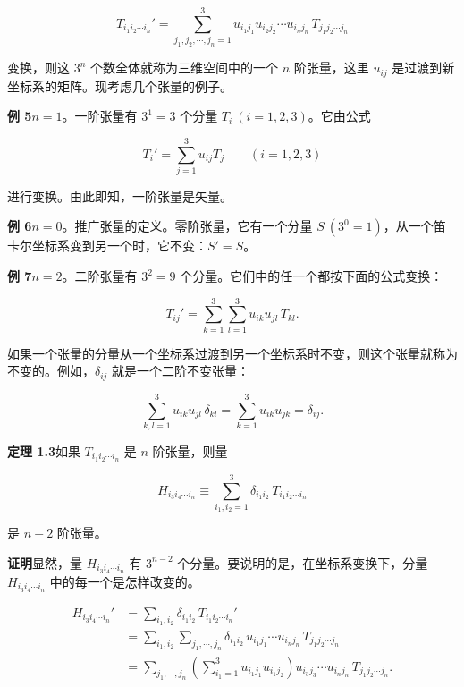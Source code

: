 \documentclass[11pt,a4paper,oneside]{ctexbook}
\begin{document}
\begin{equation}
T_{i_1 i_2 \cdots i_n}' = \sum_{j_1, j_2, \cdots, j_n = 1}^{3} u_{i_1 j_1} u_{i_2 j_2} \cdots u_{i_n j_n}\, T_{j_1 j_2 \cdots j_n}
\tag{1.21}
\end{equation}

变换，则这 $3^{n}$ 个数全体就称为三维空间中的一个 $n$ 阶张量，这里 $u_{ij}$ 是过渡到新坐标系的矩阵。现考虑几个张量的例子。

\textbf{例 5}\quad $n = 1$。一阶张量有 $3^{1} = 3$ 个分量 $T_i\ (i = 1, 2, 3)$。它由公式

\begin{equation*}
T_i' = \sum_{j=1}^{3} u_{ij} T_j \qquad (i = 1, 2, 3)
\end{equation*}

进行变换。由此即知，一阶张量是矢量。

\textbf{例 6}\quad $n = 0$。推广张量的定义。零阶张量，它有一个分量 $S\ (3^{0} = 1)$，从一个笛卡尔坐标系变到另一个时，它不变：$S' = S$。

\textbf{例 7}\quad $n = 2$。二阶张量有 $3^{2} = 9$ 个分量。它们中的任一个都按下面的公式变换：

\begin{equation*}
T_{ij}' = \sum_{k=1}^{3} \sum_{l=1}^{3} u_{ik} u_{jl}\, T_{kl}.
\end{equation*}

如果一个张量的分量从一个坐标系过渡到另一个坐标系时不变，则这个张量就称为不变的。例如，$\delta_{ij}$ 就是一个二阶不变张量：

\begin{equation*}
\sum_{k,l=1}^{3} u_{ik} u_{jl}\, \delta_{kl} = \sum_{k=1}^{3} u_{ik} u_{jk} = \delta_{ij}.
\end{equation*}

\textbf{定理 1.3}\quad 如果 $T_{i_1 i_2 \cdots i_n}$ 是 $n$ 阶张量，则量

\begin{equation*}
H_{i_3 i_4 \cdots i_n} \equiv \sum_{i_1, i_2 = 1}^{3} \delta_{i_1 i_2}\, T_{i_1 i_2 \cdots i_n}
\end{equation*}

是 $n - 2$ 阶张量。

\textbf{证明}\quad 显然，量 $H_{i_3 i_4 \cdots i_n}$ 有 $3^{n-2}$ 个分量。要说明的是，在坐标系变换下，分量 $H_{i_3 i_4 \cdots i_n}$ 中的每一个是怎样改变的。

\begin{equation*}
\begin{aligned}
H_{i_3 i_4 \cdots i_n}' &= \sum_{i_1, i_2} \delta_{i_1 i_2}\, T_{i_1 i_2 \cdots i_n}'\\
&= \sum_{i_1, i_2} \sum_{j_1, \cdots, j_n} \delta_{i_1 i_2}\, u_{i_1 j_1} \cdots u_{i_n j_n}\, T_{j_1 j_2 \cdots j_n}\\
&= \sum_{j_1, \cdots, j_n} \left(\sum_{i_1 = 1}^{3} u_{i_1 j_1} u_{i_1 j_2}\right) u_{i_3 j_3} \cdots u_{i_n j_n}\, T_{j_1 j_2 \cdots j_n}.
\end{aligned}
\end{equation*}
\end{document}
